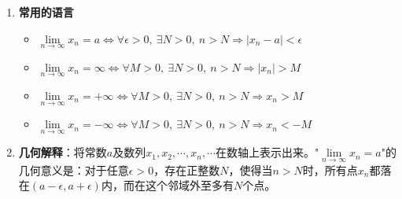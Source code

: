 \documentclass[a4paper,12pt]{article}
\begin{document}
    \begin{enumerate}
        \item \textbf{常用的语言}
        \begin{itemize}
            \item $\lim\limits_{n\to \infty} x_n = a \Leftrightarrow \forall \epsilon > 0,\ \exists N > 0,\ n > N \Rightarrow |x_n - a| < \epsilon$
            \item $\lim\limits_{n\to \infty} x_n = \infty \Leftrightarrow \forall M > 0,\ \exists N > 0,\ n > N \Rightarrow |x_n| > M$
            \item $\lim\limits_{n\to \infty} x_n = +\infty \Leftrightarrow \forall M > 0,\ \exists N > 0,\ n > N \Rightarrow x_n > M$
            \item $\lim\limits_{n\to \infty} x_n = -\infty \Leftrightarrow \forall M > 0,\ \exists N > 0,\ n > N \Rightarrow x_n < -M$
        \end{itemize}
        \item \textbf{几何解释}：将常数$a$及数列$x_1, x_2, \cdots, x_n, \cdots$在数轴上表示出来。"$\lim\limits_{n\to\infty}x_n = a$"的几何意义是：对于任意$\epsilon > 0$，存在正整数$N$，使得当$n > N$时，所有点$x_n$都落在$(a-\epsilon, a+\epsilon)$内，而在这个邻域外至多有$N$个点。
    \end{enumerate}
\end{document}
